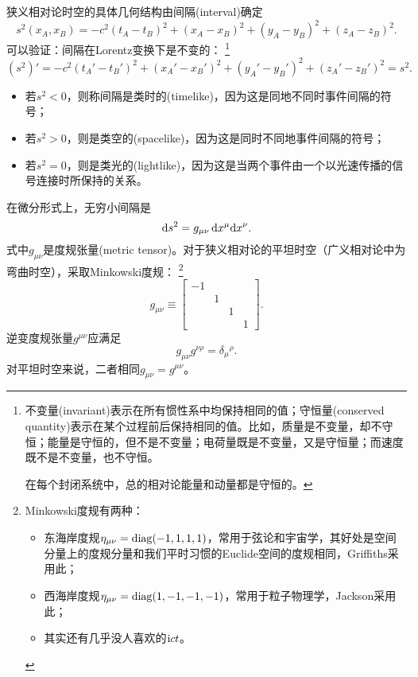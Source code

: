 狭义相对论时空的具体几何结构由间隔(interval)确定
\[
    s^2(x_A,x_B)=-c^2(t_A-t_B)^2+(x_A-x_B)^2+(y_A-y_B)^2+(z_A-z_B)^2.
\]
可以验证：间隔在Lorentz变换下是不变的：
\footnote{
不变量(invariant)表示在所有惯性系中均保持相同的值；守恒量(conserved quantity)表示在某个过程前后保持相同的值。比如，质量是不变量，却不守恒；能量是守恒的，但不是不变量；电荷量既是不变量，又是守恒量；而速度既不是不变量，也不守恒。

在每个封闭系统中，总的相对论能量和动量都是守恒的。
}
\[
    (s^2)'=-c^2(t_A'-t_B')^2+(x_A'-x_B')^2+(y_A'-y_B')^2+(z_A'-z_B')^2=s^2.
\]
\begin{itemize}
    \item 若$s^2<0$，则称间隔是类时的(timelike)，因为这是同地不同时事件间隔的符号；
    \item 若$s^2>0$，则是类空的(spacelike)，因为这是同时不同地事件间隔的符号；
    \item 若$s^2=0$，则是类光的(lightlike)，因为这是当两个事件由一个以光速传播的信号连接时所保持的关系。
\end{itemize}
在微分形式上，无穷小间隔是
\begin{equation}
    \mathop{}\!\mathrm{d} s^2=g_{\mu\nu}\mathop{}\!\mathrm{d} x^\mu\mathrm{d} x^\nu.
\end{equation}
式中$g_{\mu\nu}$是度规张量(metric tensor)。对于狭义相对论的平坦时空（广义相对论中为弯曲时空），采取Minkowski度规：
\footnote{Minkowski度规有两种：
\begin{itemize}
    \item 东海岸度规$\eta_{\mu\nu}=\operatorname{diag}(-1,1,1,1)$，常用于弦论和宇宙学，其好处是空间分量上的度规分量和我们平时习惯的Euclide空间的度规相同，Griffiths采用此；
    \item 西海岸度规$\eta_{\mu\nu}=\operatorname{diag}(1,-1,-1,-1)$，常用于粒子物理学，Jackson采用此；
    \item 其实还有几乎没人喜欢的$\mathrm{i} ct$。
\end{itemize}
}
\begin{equation}
    g_{\mu\nu}\equiv
    \begin{bmatrix}
        -1\\ &1\\ &&1\\ &&&1
    \end{bmatrix}.
\end{equation}
逆变度规张量$g^{\mu\nu}$应满足
\begin{equation}
    g_{\mu\nu}g^{\nu\rho}=\delta_\mu{}^\rho.
\end{equation}
对平坦时空来说，二者相同$g_{\mu\nu}=g^{\mu\nu}$。

